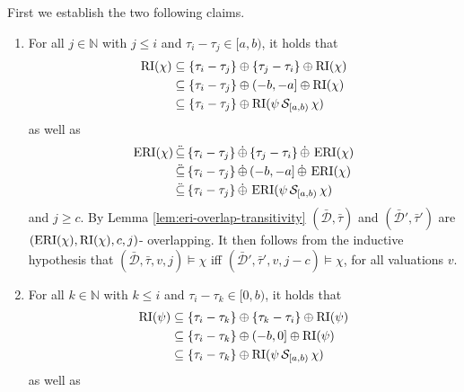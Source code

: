 \begin{itemize}
        First we establish the two following claims.
        \begin{enumerate}
            \item
                For all $j \in \mathbb{N}$ with $j \leq i$ and $\tau_i - \tau_j \in [a,b)$, it holds that 
                \begin{align*}
                    \operatorname{RI}(\chi) 
                    &\subseteq \{ \tau_i - \tau_j \} \oplus \{ \tau_j - \tau_i\} \oplus \operatorname{RI}(\chi) \\
                    &\subseteq \{\tau_i - \tau_j \} \oplus (-b, -a] \oplus \operatorname{RI}(\chi) \\
                    &\subseteq \{ \tau_i - \tau_j \} \oplus \operatorname{RI}(\psi \,\mathcal{S}_{[a,b)}\, \chi)
                \end{align*}
                as well as
                \begin{align*}
                    \operatorname{ERI}(\chi) 
                    &\,\ddot{\subseteq}\, \{ \tau_i - \tau_j \} \,\dot{\oplus}\, \{ \tau_j - \tau_i\} \,\dot{\oplus}\, \operatorname{ERI}(\chi) \\
                    &\,\ddot{\subseteq}\, \{\tau_i - \tau_j \} \,\dot{\oplus}\, (-b, -a] \,\dot{\oplus}\, \operatorname{ERI}(\chi) \\
                    &\,\ddot{\subseteq}\, \{ \tau_i - \tau_j \} \,\dot{\oplus}\, \operatorname{ERI}(\psi \,\mathcal{S}_{[a,b)}\, \chi)
                \end{align*}
                and $j \geq c$.
                By Lemma \ref{lem:eri-overlap-transitivity} $(\bar{\mathcal{D}}, \bar{\tau})$ and $(\bar{\mathcal{D}}', \bar{\tau}')$ are $(\operatorname{ERI}(\chi), \operatorname{RI}(\chi), c, j)$- overlapping.
                It then follows from the inductive hypothesis that $(\bar{\mathcal{D}}, \bar{\tau}, v, j) \models \chi$ iff $(\bar{\mathcal{D}}', \bar{\tau}', v, j-c) \models \chi$, for all valuations $v$.
            \item
                For all $k \in \mathbb{N}$ with $k \leq i$ and $\tau_i - \tau_k \in [0,b)$, it holds that
                \begin{align*}
                    \operatorname{RI}(\psi)
                    &\subseteq \{ \tau_i - \tau_k \} \oplus \{ \tau_k - \tau_i \} \oplus \operatorname{RI}(\psi) \\
                    &\subseteq \{ \tau_i - \tau_k \} \oplus (-b,0] \oplus \operatorname{RI}(\psi) \\
                    &\subseteq \{ \tau_i - \tau_k \} \oplus \operatorname{RI}(\psi \,\mathcal{S}_{[a,b)}\, \chi) \\
                \end{align*}
                as well as
                \begin{align*}

\end{align*}
\end{enumerate}
\end{itemize}
